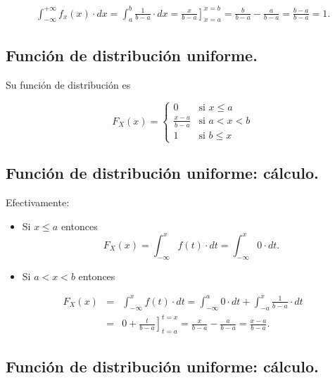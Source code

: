 \documentclass[]{book}
\providecommand{\tightlist}{%
  \setlength{\itemsep}{0pt}\setlength{\parskip}{0pt}}
\begin{document}
\[
\begin{eqnarray*}
\displaystyle\int_{-\infty}^{+\infty} f_x(x)\cdot dx=\int_{a}^{b} \frac{1}{b-a} \cdot dx=\left.\frac{x}{b-a}\right]_{x=a}^{x=b}=\frac{b}{b-a}-\frac{a}{b-a}=
\frac{b-a}{b-a}=1.
\end{eqnarray*}
\]

\hypertarget{funciuxf3n-de-distribuciuxf3n-uniforme.}{%
\subsection{Función de distribución uniforme.}\label{funciuxf3n-de-distribuciuxf3n-uniforme.}}

Su función de distribución es

\[
F_X(x)=\left\{\begin{array}{ll} 0  & \mbox{si } x\leq a\\
\frac{x-a}{b-a} & \mbox{si } a<x<b\\ 1  & \mbox{si } b\leq x
\end{array}
\right. 
\]

\hypertarget{funciuxf3n-de-distribuciuxf3n-uniforme-cuxe1lculo.}{%
\subsection{Función de distribución uniforme: cálculo.}\label{funciuxf3n-de-distribuciuxf3n-uniforme-cuxe1lculo.}}

Efectivamente:

\begin{itemize}
\tightlist
\item
  Si \(x\leq a\) entonces
  \[F_X(x)=\displaystyle\int_{-\infty}^{x} f(t)\cdot dt= \displaystyle\int_{-\infty}^{x} 0\cdot dt.\]
\item
  Si \(a<x<b\) entonces
\end{itemize}

\[
\begin{eqnarray*}
F_X(x)&=&\int_{-\infty}^{x} f(t)\cdot dt= \int_{-\infty}^{a} 0\cdot dt+\int_{-a}^{x} \frac1{b-a} \cdot dt\\
&=& 0 +\left.\frac{t}{b-a}\right]_{t=a}^{t=x}= \frac{x}{b-a}-\frac{a}{b-a}=\frac{x-a}{b-a}.
\end{eqnarray*}
\]

\hypertarget{funciuxf3n-de-distribuciuxf3n-uniforme-cuxe1lculo.-1}{%
\subsection{Función de distribución uniforme: cálculo.}\label{funciuxf3n-de-distribuciuxf3n-uniforme-cuxe1lculo.-1}}
\end{document}
